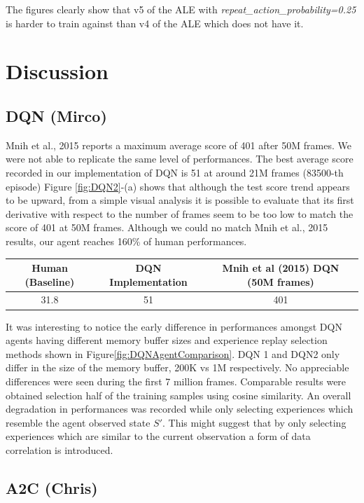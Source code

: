 \documentclass{article}
\begin{document}
The figures clearly show that v5 of the ALE with \emph{repeat\_action\_probability=0.25} is harder to train against than v4 of the ALE which does not have it. 


\section{Discussion}
    

\subsection{DQN (Mirco)}
Mnih et al., 2015 reports a maximum average score of 401 after 50M frames. We were not able to replicate the same level of performances. The best average score recorded in our implementation of DQN is 51 at around 21M frames (83500-th episode) Figure \ref{fig:DQN2}-(a) shows that although the test score trend appears to be upward, from a simple visual analysis it is possible to evaluate that its first derivative with respect to the number of frames seem to be too low to match the score of 401 at 50M frames. Although we could no match Mnih et al., 2015 results, our agent reaches 160\% of human performances.
\begin{table}[h!]
\centering
\begin{tabular}{|c | c | c |} 
 \hline
 Human (Baseline) & DQN Implementation & Mnih et al (2015) DQN (50M frames) \\ [0.5ex] 
 \hline
 31.8 & 51 & 401  \\ 
 \hline
\end{tabular}
\end{table}
It was interesting to notice the early difference in performances amongst DQN agents having different memory buffer sizes and experience replay selection methods shown in Figure\ref{fig:DQNAgentComparison}. DQN 1 and DQN2 only differ in the size of the memory buffer, 200K vs 1M respectively. No appreciable differences were seen during the first 7 million frames. Comparable results were obtained selection half of the training samples using cosine similarity. An overall degradation in performances was recorded while only selecting experiences which resemble the agent observed state $S'$. This might suggest that by only selecting experiences which are similar to the current observation a form of data correlation is introduced.

\subsection{A2C (Chris)}
\end{document}
